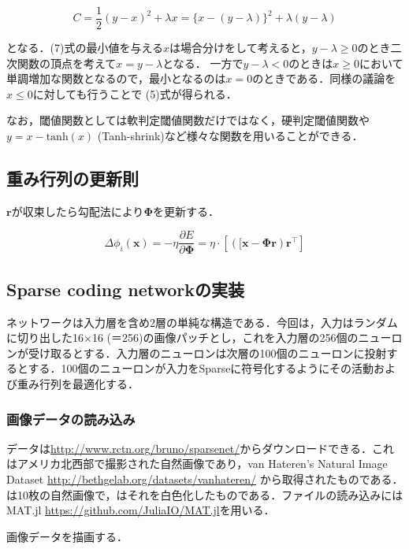 \begin{equation}
C=\frac{1}{2}(y-x)^2+\lambda x = \{x-(y-\lambda)\}^2+\lambda(y-\lambda)
\end{equation}


となる．(7)式の最小値を与える$x$は場合分けをして考えると，$y-\lambda\geq0$のとき二次関数の頂点を考えて$x=y-\lambda$となる． 一方で$y-\lambda<0$のときは$x\geq0$において単調増加な関数となるので，最小となるのは$x=0$のときである．同様の議論を$x\leq0$に対しても行うことで (5)式が得られる．

なお，閾値関数としては軟判定閾値関数だけではなく，硬判定閾値関数や$y=x - \text{tanh}(x)$ (Tanh-shrink)など様々な関数を用いることができる．
\subsection{重み行列の更新則}
$\mathbf{r}$が収束したら勾配法により$\mathbf{\Phi}$を更新する．


\begin{equation}
\Delta \phi_i(\boldsymbol{x}) = -\eta \frac{\partial E}{\partial \mathbf{\Phi}}=\eta\cdot\left[\left([\mathbf{x}-\mathbf{\Phi}\mathbf{r}\right)\mathbf{r}^\top\right]
\end{equation}
\subsection{Sparse coding networkの実装}
ネットワークは入力層を含め2層の単純な構造である．今回は，入力はランダムに切り出した16×16 (＝256)の画像パッチとし，これを入力層の256個のニューロンが受け取るとする．入力層のニューロンは次層の100個のニューロンに投射するとする．100個のニューロンが入力をSparseに符号化するようにその活動および重み行列を最適化する．
\subsubsection{画像データの読み込み}
データは\url{http://www.rctn.org/bruno/sparsenet/}からダウンロードできる．これはアメリカ北西部で撮影された自然画像であり，van Hateren's Natural Image Dataset \url{http://bethgelab.org/datasets/vanhateren/} から取得されたものである．は10枚の自然画像で，はそれを白色化したものである．ファイルの読み込みには MAT.jl \url{https://github.com/JuliaIO/MAT.jl}を用いる．


画像データを描画する．


